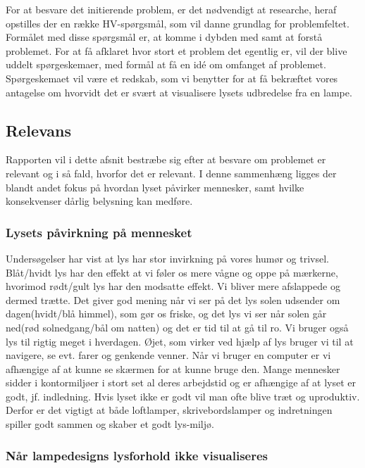 For at besvare det initierende problem, er det nødvendigt at researche, heraf opstilles der en række HV-spørgsmål, som vil danne grundlag for problemfeltet. Formålet med disse spørgsmål er, at komme i dybden med samt at forstå problemet.  
\newline For at få afklaret hvor stort et problem det egentlig er, vil der blive uddelt spørgeskemaer, med formål at få en idé om omfanget af problemet. 
Spørgeskemaet vil være et redskab, som vi benytter for at få bekræftet vores antagelse om hvorvidt det er svært at visualisere lysets udbredelse fra en lampe. 

\subsection{Relevans}
Rapporten vil i dette afsnit bestræbe sig efter at besvare om problemet er relevant og i så fald, hvorfor det er relevant. I denne sammenhæng ligges der blandt andet fokus på hvordan lyset påvirker mennesker, samt hvilke konsekvenser dårlig belysning kan medføre. 

\subsubsection{Lysets påvirkning på mennesket}

Undersøgelser har vist at lys har stor invirkning på vores humør og trivsel.
Blåt/hvidt lys har den effekt at vi føler os mere vågne og oppe på mærkerne\cite{videnskab_dk_paavirkning}, hvorimod rødt/gult lys har den modsatte effekt. Vi bliver mere afslappede og dermed trætte. Det giver god mening når vi ser på det lys solen udsender om dagen(hvidt/blå himmel), som gør os friske, og det lys vi ser når solen går ned(rød solnedgang/bål om natten) og det er tid til at gå til ro. 
\newline Vi bruger også lys til rigtig meget i hverdagen. Øjet, som virker ved hjælp af lys bruger vi til at navigere, se evt. farer og genkende venner. Når vi bruger en computer er vi afhængige af at kunne se skærmen for at kunne bruge den. 
\newline Mange mennesker sidder i kontormiljøer i stort set al deres arbejdstid og er afhængige af at lyset er godt, jf. indledning. Hvis lyset ikke er godt vil man ofte blive træt og uproduktiv. Derfor er det vigtigt at både loftlamper, skrivebordslamper og indretningen spiller godt sammen og skaber et godt lys-miljø.


\subsubsection{Når lampedesigns lysforhold ikke visualiseres}

